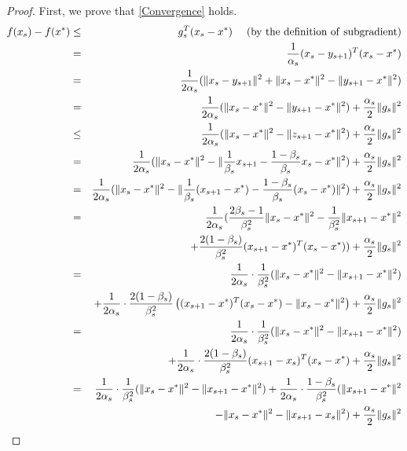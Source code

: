 \documentclass[sn-mathphys]{JORSC-jnl}%
\theoremstyle{thmstyleone}%
\theoremstyle{thmstylethree}%
\begin{document}
\begin{proof}
	First, we prove that \eqref{Convergence} holds.
	\begin{eqnarray}
		f(x_s)-f(x^*)&\leq& g_s^T(x_s-x^*) \nonumber~~~~({\rm by ~the~ definition~ of~  subgradient}) \\
		&=& \frac{1}{\alpha_s}(x_s-y_{s+1})^T(x_s-x^*) \nonumber\\
		&=& \frac{1}{2\alpha_s}(\Vert x_s-y_{s+1} \Vert^2+\Vert x_s-x^* \Vert^2-\Vert y_{s+1}-x^* \Vert^2)\label{eq1}\\
		&=& \frac{1}{2\alpha_s}(\Vert x_s-x^* \Vert^2-\Vert y_{s+1}-x^* \Vert^2)+\frac{\alpha_s}{2}\Vert g_s \Vert^2 \nonumber\\
		&\leq& \frac{1}{2\alpha_s}(\Vert x_s-x^* \Vert^2-\Vert z_{s+1}-x^* \Vert^2)+\frac{\alpha_s}{2}\Vert g_s \Vert^2\label{ineq1}\\
		&=& \frac{1}{2\alpha_s}(\Vert x_s-x^* \Vert^2-\Vert \frac{1}{\beta_s}x_{s+1}-\frac{1-\beta_s}{\beta_s}x_s-x^* \Vert^2)+\frac{\alpha_s}{2}\Vert g_s \Vert^2\nonumber\\
		&=& \frac{1}{2\alpha_s}(\Vert x_s-x^* \Vert^2-\Vert \frac{1}{\beta_s}(x_{s+1}-x^*)-\frac{1-\beta_s}{\beta_s}(x_s-x^*) \Vert^2)+\frac{\alpha_s}{2}\Vert g_s \Vert^2\nonumber\\
		&=& \frac{1}{2\alpha_s}(\frac{2\beta_s-1}{\beta_s^2}\Vert x_s-x^* \Vert^2-\frac{1}{\beta_s^2}\Vert x_{s+1}-x^* \Vert^2\nonumber\\
		&&+\frac{2(1-\beta_s)}{\beta_s^2}(x_{s+1}-x^*)^T(x_s-x^*))+\frac{\alpha_s}{2}\Vert g_s \Vert^2\nonumber\\
		&=& \frac{1}{2\alpha_s}\cdot\frac{1}{\beta_s^2}(\Vert x_s-x^* \Vert^2-\Vert x_{s+1}-x^* \Vert^2)\nonumber\\
		&&+\frac{1}{2\alpha_s}\cdot\frac{2(1-\beta_s)}{\beta_s^2}\left((x_{s+1}-x^*)^T(x_s-x^*)-\Vert x_s-x^* \Vert^2\right)+\frac{\alpha_s}{2}\Vert g_s \Vert^2\nonumber\\
		&=& \frac{1}{2\alpha_s}\cdot\frac{1}{\beta_s^2}(\Vert x_s-x^* \Vert^2-\Vert x_{s+1}-x^* \Vert^2)\nonumber\\
		&&+\frac{1}{2\alpha_s}\cdot\frac{2(1-\beta_s)}{\beta_s^2}(x_{s+1}-x_s)^T(x_s-x^*)+\frac{\alpha_s}{2}\Vert g_s \Vert^2\nonumber\\
		&=& \frac{1}{2\alpha_s}\cdot\frac{1}{\beta_s^2}(\Vert x_s-x^* \Vert^2-\Vert x_{s+1}-x^* \Vert^2)+\frac{1}{2\alpha_s}\cdot\frac{1-\beta_s}{\beta_s^2}(\Vert x_{s+1}-x^* \Vert^2\nonumber\\
		&&-\Vert x_s-x^* \Vert^2-\Vert x_{s+1}-x_s \Vert^2)+\frac{\alpha_s}{2}\Vert g_s \Vert^2\label{eq2}\\

\end{eqnarray}
\end{proof}
\end{document}
